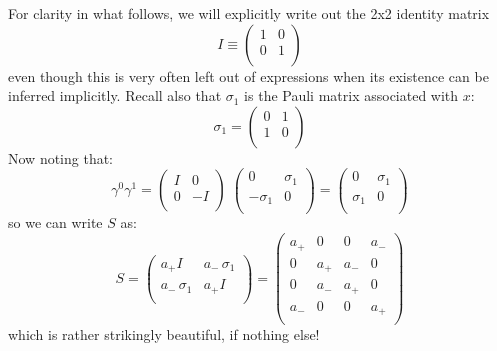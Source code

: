 \documentclass[12pt]{book}
\begin{document}
For clarity in what follows, we will explicitly write out the 2x2 identity matrix 
$$I \equiv \begin{pmatrix} 
1 & 0 \\
0 & 1 \\
\end{pmatrix}
$$
even though this is very often left out of expressions when its existence can be inferred implicitly.  Recall also that $\sigma_1$ is the Pauli matrix associated with $x$:
$$\sigma_1 = \begin{pmatrix} 
0 & 1 \\ 
1 & 0 \\
\end{pmatrix}
$$
Now noting that:
$$\gamma^0 \gamma^1 = 
\begin{pmatrix} 
I &  0 \\ 
0 & -I \\
\end{pmatrix}
\;
\begin{pmatrix} 
0 & \sigma_1 \\ 
-\sigma_1 & 0 \\
\end{pmatrix}
=
\begin{pmatrix} 
0 & \sigma_1 \\ 
\sigma_1 & 0 \\
\end{pmatrix}
$$
so we can write $S$ as:
$$S = \begin{pmatrix} 
a_+ I & a_- \, \sigma_1 \\ 
a_- \, \sigma_1 & a_+ I \\
\end{pmatrix}
= \begin{pmatrix} 
a_+ & 0 & 0   & a_- \\
0 & a_+ & a_- & 0 \\
0 & a_- & a_+ & 0 \\
a_- & 0 & 0 & a_+ \\
\end{pmatrix}
$$
which is rather strikingly beautiful, if nothing else!  
\end{document}

